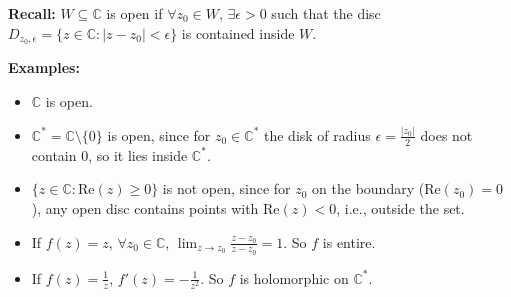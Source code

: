 \textbf{Recall:} $W \subseteq \mathbb{C}$ is open if $\forall z_{0} \in W$, $\exists \epsilon > 0$ such that the disc $D_{z_{0}, \epsilon} = \{z \in \mathbb{C} : |z - z_{0}| < \epsilon\}$ is contained inside $W$.

\textbf{Examples:}
\begin{itemize}
    \item $\mathbb{C}$ is open.
    \item $\mathbb{C}^{*} = \mathbb{C} \setminus \{0\}$ is open, since for $z_{0} \in \mathbb{C}^{*}$ the disk of radius $\epsilon = \frac{|z_{0}|}{2}$ does not contain $0$, so it lies inside $\mathbb{C}^{*}$.
    \item $\{z \in \mathbb{C} : \text{Re}(z) \geq 0\}$ is not open, since for $z_{0}$ on the boundary ($\text{Re}(z_{0}) = 0$), any open disc contains points with $\text{Re}(z) < 0$, i.e., outside the set.
\end{itemize}

\begin{itemize}
    \item If $f(z) = z$, $\forall z_{0} \in \mathbb{C}$, $\lim_{z \to z_{0}} \frac{z - z_{0}}{z - z_{0}} = 1$. So $f$ is entire.
    \item If $f(z) = \frac{1}{z}$, $f'(z) = -\frac{1}{z^{2}}$. So $f$ is holomorphic on $\mathbb{C}^{*}$.
\end{itemize}